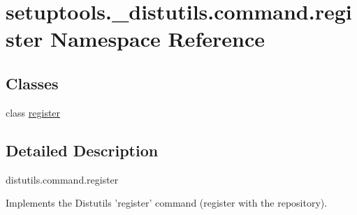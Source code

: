 \hypertarget{namespacesetuptools_1_1__distutils_1_1command_1_1register}{}\section{setuptools.\+\_\+distutils.\+command.\+register Namespace Reference}
\label{namespacesetuptools_1_1__distutils_1_1command_1_1register}
\subsection*{Classes}
\begin{DoxyCompactItemize}
\item 
class \hyperlink{classsetuptools_1_1__distutils_1_1command_1_1register_1_1register}{register}
\end{DoxyCompactItemize}


\subsection{Detailed Description}
\begin{DoxyVerb}distutils.command.register

Implements the Distutils 'register' command (register with the repository).
\end{DoxyVerb}
 